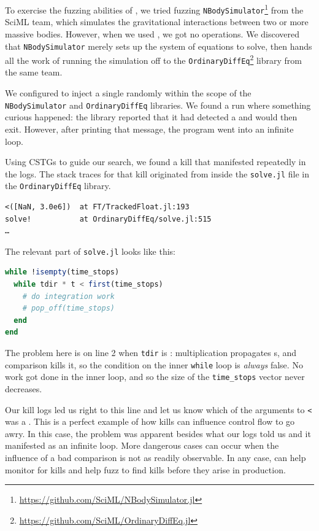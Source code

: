 \documentclass{juliacon}
\begin{document}
To exercise the fuzzing abilities of \FT{}, we tried fuzzing \texttt{NBodySimulator}\footnote{\url{https://github.com/SciML/NBodySimulator.jl}} from the SciML team, which simulates the gravitational interactions between two or more massive bodies.
However, when we used \FT{}, we got no \fp{} operations.
We discovered that \texttt{NBodySimulator} merely sets up the system of equations to solve, then hands all the work of running the simulation off to the \texttt{OrdinaryDiffEq}\footnote{\url{https://github.com/SciML/OrdinaryDiffEq.jl}} library from the same team.

We configured \FT{} to inject a single \NaN{} randomly within the scope of the \texttt{NBodySimulator} and \texttt{OrdinaryDiffEq} libraries.
We found a run where something curious happened: the library reported that it had detected a \NaN{} and would then exit.
However, after printing that message, the program went into an infinite loop.

Using CSTGs to guide our search, we found a \NaN{} kill that manifested repeatedly in the logs.
The stack traces for that kill originated from inside the \texttt{solve.jl} file in the \texttt{OrdinaryDiffEq} library.

\begin{verbatim}
<([NaN, 3.0e6])  at FT/TrackedFloat.jl:193
solve!           at OrdinaryDiffEq/solve.jl:515
…
\end{verbatim}

The relevant part of \texttt{solve.jl} looks like this:


\begin{lstlisting}[language = Julia]
while !isempty(time_stops)
  while tdir * t < first(time_stops)
    # do integration work
    # pop_off(time_stops)
  end
end
\end{lstlisting}

The problem here is on line 2 when \texttt{tdir} is \NaN{}: multiplication propagates \NaN{}s, and comparison kills it, so the condition on the inner \texttt{while} loop is \emph{always} false.
No work got done in the inner loop, and so the size of the \texttt{time\_stops} vector never decreases.

Our kill logs led us right to this line and let us know which of the arguments to \texttt{<} was a \NaN{}.
This is a perfect example of how \NaN{} kills can influence control flow to go awry.
In this case, the problem was apparent besides what our logs told us and it manifested as an infinite loop.
More dangerous cases can occur when the influence of a bad comparison is not as readily observable.
In any case, \FT{} can help monitor for kills and help fuzz to find kills before they arise in production.
\end{document}
